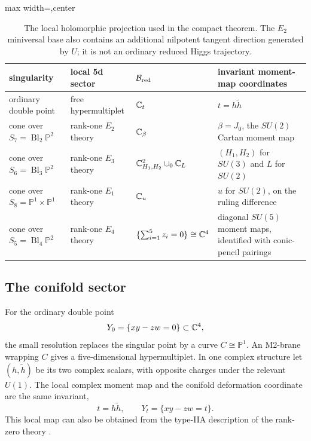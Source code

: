 \begin{table}[t]
\centering
\small
\begin{adjustbox}{max width=\textwidth,center}
\begin{tabular}{@{}
>{\raggedright\arraybackslash}p{}
>{\raggedright\arraybackslash}p{}
>{\raggedright\arraybackslash}p{}
>{\raggedright\arraybackslash}p{}@{}}
\toprule
singularity & local 5d sector & $\mathcal B_{\mathrm{red}}$ & invariant moment-map coordinates \\
\midrule
ordinary double point & free hypermultiplet & $\mathbb C_t$ & $t=h\widetilde h$ \\
cone over $S_7=\operatorname{Bl}_2\mathbb P^2$ & rank-one $E_2$ theory & $\mathbb C_\beta$ & $\beta=J_0$, the $SU(2)$ Cartan moment map \\
cone over $S_6=\operatorname{Bl}_3\mathbb P^2$ & rank-one $E_3$ theory & $\mathbb C^2_{H_1,H_2}\cup_{0}\mathbb C_L$ & $(H_1,H_2)$ for $SU(3)$ and $L$ for $SU(2)$ \\
cone over $S_8=\mathbb P^1\times\mathbb P^1$ & rank-one $E_1$ theory & $\mathbb C_u$ & $u$ for $SU(2)$, on the ruling difference \\
cone over $S_5=\operatorname{Bl}_4\mathbb P^2$ & rank-one $E_4$ theory & $\{\sum_{i=1}^5z_i=0\}\cong\mathbb C^4$ & diagonal $SU(5)$ moment maps, identified with conic-pencil pairings \\
\bottomrule
\end{tabular}
\end{adjustbox}
\caption{The local holomorphic projection used in the compact theorem. The
$E_2$ miniversal base also contains an additional nilpotent tangent direction
generated by $U$; it is not an ordinary reduced Higgs trajectory.}
\label{tab:local-dictionary}
\end{table}

\subsection{The conifold sector}
\label{subsec:conifold-sector}

For the ordinary double point
\begin{equation}
 Y_0=\{xy-zw=0\}\subset\mathbb C^4,
 \label{eq:conifold}
\end{equation}
the small resolution replaces the singular point by a curve
$C\cong\mathbb P^1$. An M2-brane wrapping $C$ gives a five-dimensional
hypermultiplet. In one complex structure let $(h,\widetilde h)$ be its two
complex scalars, with opposite charges under the relevant $U(1)$. The local
complex moment map and the conifold deformation coordinate are the same
invariant,
\begin{equation}
 t=h\widetilde h,
 \qquad
 Y_t=\{xy-zw=t\}.
 \label{eq:conifold-map}
\end{equation}
This local map can also be obtained from the type-IIA description of the
rank-zero theory \cite{Collinucci:2021jgb}.

